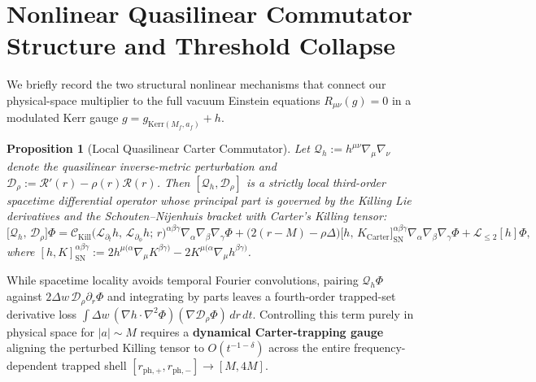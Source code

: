 \documentclass[11pt, a4paper]{article}
\newtheorem{proposition}[theorem]{Proposition}
\theoremstyle{remark}
\begin{document}
\section{Nonlinear Quasilinear Commutator Structure and Threshold Collapse}
\label{sec:nonlinear}

We briefly record the two structural nonlinear mechanisms that connect our physical-space multiplier to the full vacuum Einstein equations $R_{\mu\nu}(g) = 0$ in a modulated Kerr gauge $g = g_{\mathrm{Kerr}(M_f, a_f)} + h$.

\begin{proposition}[Local Quasilinear Carter Commutator]
\label{prop:sn-comm}
Let $\mathcal{Q}_h := h^{\mu\nu}\nabla_\mu\nabla_\nu$ denote the quasilinear inverse-metric perturbation and $\mathcal{D}_\rho := \mathcal{R}'(r) - \rho(r)\mathcal{R}(r)$. Then $[\mathcal{Q}_h, \mathcal{D}_\rho]$ is a strictly local third-order spacetime differential operator whose principal part is governed by the Killing Lie derivatives and the Schouten--Nijenhuis bracket with Carter's Killing tensor:
\begin{equation}
\big[\mathcal{Q}_h,\, \mathcal{D}_\rho\big]\Phi = \mathcal{C}_{\mathrm{Kill}}\big(\mathcal{L}_{\partial_t} h,\, \mathcal{L}_{\partial_\phi} h;\, r\big)^{\alpha\beta\gamma}\nabla_\alpha\nabla_\beta\nabla_\gamma\Phi + \big(2(r - M) - \rho\Delta\big)\big[h,\, K_{\mathrm{Carter}}\big]_{\mathrm{SN}}^{\alpha\beta\gamma}\nabla_\alpha\nabla_\beta\nabla_\gamma\Phi + \mathcal{L}_{\le 2}[h]\Phi,
\end{equation}
where $[h, K]_{\mathrm{SN}}^{\alpha\beta\gamma} := 2 h^{\mu(\alpha}\nabla_\mu K^{\beta\gamma)} - 2 K^{\mu(\alpha}\nabla_\mu h^{\beta\gamma)}$.
\end{proposition}

While spacetime locality avoids temporal Fourier convolutions, pairing $\mathcal{Q}_h\Phi$ against $2\Delta w\,\mathcal{D}_\rho\partial_r\Phi$ and integrating by parts leaves a fourth-order trapped-set derivative loss $\int \Delta w\,(\nabla h\cdot\nabla^2\Phi)(\nabla\mathcal{D}_\rho\Phi)\,dr\,dt$. Controlling this term purely in physical space for $|a| \sim M$ requires a \textbf{dynamical Carter-trapping gauge} aligning the perturbed Killing tensor to $O(t^{-1-\delta})$ across the entire frequency-dependent trapped shell $[r_{\mathrm{ph},+}, r_{\mathrm{ph},-}] \to [M, 4M]$.
\end{document}
